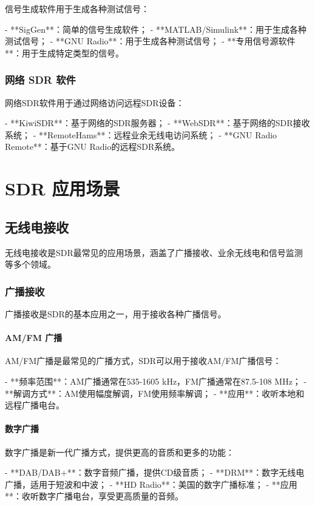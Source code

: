 ﻿\documentclass[UTF8]{ctexbook}
\begin{document}
信号生成软件用于生成各种测试信号：

- **SigGen**：简单的信号生成软件；
- **MATLAB/Simulink**：用于生成各种测试信号；
- **GNU Radio**：用于生成各种测试信号；
- **专用信号源软件**：用于生成特定类型的信号。

\subsection{网络 SDR 软件}

网络SDR软件用于通过网络访问远程SDR设备：

- **KiwiSDR**：基于网络的SDR服务器；
- **WebSDR**：基于网络的SDR接收系统；
- **RemoteHams**：远程业余无线电访问系统；
- **GNU Radio Remote**：基于GNU Radio的远程SDR系统。

\chapter{SDR 应用场景}

\section{无线电接收}

无线电接收是SDR最常见的应用场景，涵盖了广播接收、业余无线电和信号监测等多个领域。

\subsection{广播接收}

广播接收是SDR的基本应用之一，用于接收各种广播信号。

\subsubsection{AM/FM 广播}

AM/FM广播是最常见的广播方式，SDR可以用于接收AM/FM广播信号：

- **频率范围**：AM广播通常在535-1605 kHz，FM广播通常在87.5-108 MHz；
- **解调方式**：AM使用幅度解调，FM使用频率解调；
- **应用**：收听本地和远程广播电台。

\subsubsection{数字广播}

数字广播是新一代广播方式，提供更高的音质和更多的功能：

- **DAB/DAB+**：数字音频广播，提供CD级音质；
- **DRM**：数字无线电广播，适用于短波和中波；
- **HD Radio**：美国的数字广播标准；
- **应用**：收听数字广播电台，享受更高质量的音频。
\end{document}
